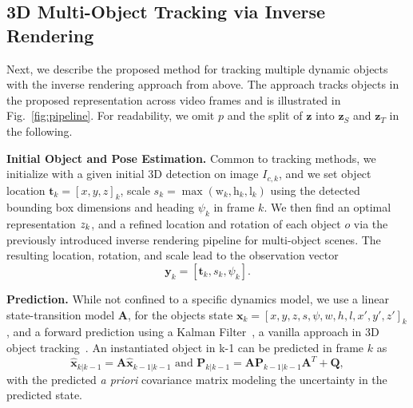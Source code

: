 \subsection{3D Multi-Object Tracking via Inverse Rendering}
Next, we describe the proposed method for tracking multiple dynamic objects with the inverse rendering approach from above. The approach tracks objects in the proposed representation across video frames and is illustrated in Fig.~\ref{fig:pipeline}. For readability, we omit $p$ and the split of $\mathbf{z}$ into $\mathbf{z}_S$ and $\mathbf{z}_T$ in the following.

\vspace{0.5\baselineskip} \noindent \textbf{Initial Object and Pose Estimation.}
Common to tracking methods, we initialize with a given initial 3D detection on image $I_{c,k}$, and we set object location $\mathbf{t}_{k} = \left[x, y, z\right]_{k}$, scale $s_{k} = \max(\text{w}_{k}, \text{h}_{k}, \text{l}_{k})$ using the detected bounding box dimensions and heading $\psi_{k}$ in frame $k$. We then find an optimal representation $\boldmath{z}_k$, and a refined location and rotation of each object $o$ via the previously introduced inverse rendering pipeline for multi-object scenes. The resulting location, rotation, and scale lead to the observation vector 
\begin{equation}\label{eq:observation}
\mathbf{y}_{k} = [\mathbf{t}_{k}, s_{k},\psi_{k}] .
\end{equation}

\vspace{-16pt}
\vspace{0.5\baselineskip} \noindent \textbf{Prediction.}
%
While not confined to a specific dynamics model, we use a linear state-transition model $\textbf{A}$, for the objects state $\mathbf{x}_{k} = [x, y, z, s, \psi, w, h, l, {x}', {y}', {z}']_{k}$, and a forward prediction using a Kalman Filter~\cite{kalman1960new}, a vanilla approach in 3D object tracking~\cite{weng2020AB3DMOT}. An instantiated object in k-1 can be predicted in frame $k$ as
\begin{equation}
   \hat{\mathbf{x}}_{k|k-1} = \mathbf{A}\hat{\mathbf{x}}_{k-1|k-1} \text{ and } \mathbf{P}_{k|k-1} = \mathbf{A}\mathbf{P}_{k-1|k-1}\mathbf{A}^T + \mathbf{Q}, 
\end{equation}
with the predicted \textit{a priori} covariance matrix modeling the uncertainty in the predicted state.


